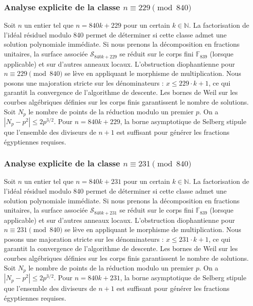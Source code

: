 \documentclass[11pt,a4paper]{article}
\begin{document}
\subsubsection{Analyse explicite de la classe $n \equiv 229 \pmod{840}$}
Soit $n$ un entier tel que $n = 840k + 229$ pour un certain $k \in \mathbb{N}$.
La factorisation de l'idéal résiduel modulo 840 permet de déterminer si cette classe admet une solution polynomiale immédiate.
Si nous prenons la décomposition en fractions unitaires, la surface associée $\mathcal{S}_{840k+229}$ se réduit sur le corps fini $\mathbb{F}_{839}$ (lorsque applicable) et sur d'autres anneaux locaux.
L'obstruction diophantienne pour $n \equiv 229 \pmod{840}$ se lève en appliquant le morphisme de multiplication.
Nous posons une majoration stricte sur les dénominateurs : $x \le 229 \cdot k + 1$, ce qui garantit la convergence de l'algorithme de descente.
Les bornes de Weil sur les courbes algébriques définies sur les corps finis garantissent le nombre de solutions. Soit $N_p$ le nombre de points de la réduction modulo un premier $p$.
On a $|N_p - p^2| \le 2 p^{3/2}$.
Pour $n = 840k + 229$, la borne asymptotique de Selberg stipule que l'ensemble des diviseurs de $n+1$ est suffisant pour générer les fractions égyptiennes requises.

\subsubsection{Analyse explicite de la classe $n \equiv 231 \pmod{840}$}
Soit $n$ un entier tel que $n = 840k + 231$ pour un certain $k \in \mathbb{N}$.
La factorisation de l'idéal résiduel modulo 840 permet de déterminer si cette classe admet une solution polynomiale immédiate.
Si nous prenons la décomposition en fractions unitaires, la surface associée $\mathcal{S}_{840k+231}$ se réduit sur le corps fini $\mathbb{F}_{839}$ (lorsque applicable) et sur d'autres anneaux locaux.
L'obstruction diophantienne pour $n \equiv 231 \pmod{840}$ se lève en appliquant le morphisme de multiplication.
Nous posons une majoration stricte sur les dénominateurs : $x \le 231 \cdot k + 1$, ce qui garantit la convergence de l'algorithme de descente.
Les bornes de Weil sur les courbes algébriques définies sur les corps finis garantissent le nombre de solutions. Soit $N_p$ le nombre de points de la réduction modulo un premier $p$.
On a $|N_p - p^2| \le 2 p^{3/2}$.
Pour $n = 840k + 231$, la borne asymptotique de Selberg stipule que l'ensemble des diviseurs de $n+1$ est suffisant pour générer les fractions égyptiennes requises.
\end{document}
